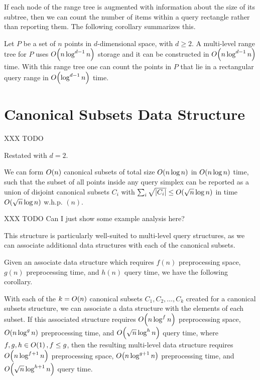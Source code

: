 If each node of the range tree is augmented with information about the size of its subtree, then we can count the number of items within a query rectangle rather than reporting them. The following corollary summarizes this.

\begin{corollary}
\label{cor:rangetree}
Let $P$ be a set of $n$ points in $d$-dimensional space, with $d \geq 2$. A multi-level range tree for $P$ uses $O\!\left(n \log^{d-1}{n}\right)$ storage and it can be constructed in $O\!\left(n \log^{d-1}{n}\right)$ time. With this range tree one can count the points in $P$ that lie in a rectangular query range in $O\!\left(\log^{d-1}{n}\right)$ time.
\end{corollary}


\section{Canonical Subsets Data Structure}
\label{:prelim:chan}

XXX TODO

Restated with $d=2$.

\begin{theorem}
\label{th:chan}
We can form $O\!\left(n\right)$ canonical subsets of total size $O\!\left(n \log{n}\right)$ in $O\!\left(n \log{n}\right)$ time, such that the subset of all points inside any query simplex can be reported as a union of disjoint canonical subsets $C_i$ with $\sum_i{\sqrt{|C_i|}} \leq O\!\left(\sqrt{n}\log{n}\right)$ in time $O\!\left(\sqrt{n}\log{n}\right)$ w.h.p. $(n)$.
\end{theorem}

XXX TODO Can I just show some example analysis here?

This structure is particularly well-suited to multi-level query structures, as we can associate additional data structures with each of the canonical subsets.

Given an associate data structure which requires $f(n)$ preprocessing space, $g(n)$ preprocessing time, and $h(n)$ query time, we have the following corollary.

\begin{corollary}
\label{cor:chan}
With each of the $k = O\!\left(n\right)$ canonical subsets $C_1, C_2, \ldots, C_k$ created for a canonical subsets structure, we can associate a data structure with the elements of each subset. If this associated structure requires $O\!\left(n\log^f{n}\right)$ preprocessing space, $O\!\left(n \log^g{n}\right)$ preprocessing time, and $O\!\left(\sqrt{n}\log^h{n}\right)$ query time, where $f, g, h \in O\!\left(1\right), f \leq g$, then the resulting multi-level data structure requires $O\!\left(n\log^{f+1}{n}\right)$ preprocessing space, $O\!\left(n\log^{g+1}{n}\right)$ preprocessing time, and $O\!\left(\sqrt{n}\log^{h+1}{n}\right)$ query time.
\end{corollary}

